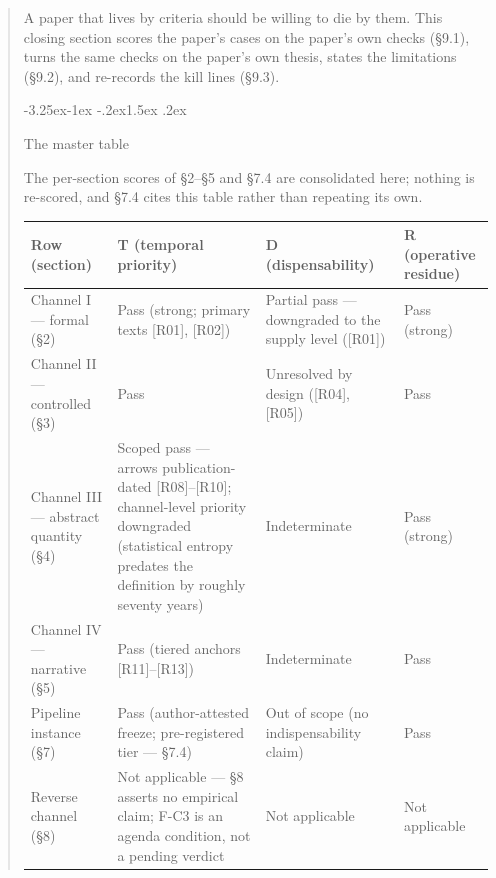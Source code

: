 \documentclass[11pt,a4paper]{article}
\makeatletter
\renewcommand\subsection{\@startsection{subsection}{2}{\z@}%
  {-3.25ex\@plus -1ex \@minus -.2ex}{1.5ex \@plus .2ex}%
  {\normalfont\large\bfseries\raggedright}}
\makeatother
\begin{document}
\begin{abstract}
A paper that lives by criteria should be willing to die by them. This closing section scores the paper's cases on the paper's own checks (§9.1), turns the same checks on the paper's own thesis, states the limitations (§9.2), and re-records the kill lines (§9.3).

\subsection{The master table}

The per-section scores of §2–§5 and §7.4 are consolidated here; nothing is re-scored, and §7.4 cites this table rather than repeating its own.

\begin{table}[htbp]
\centering
\footnotesize
\setlength{\tabcolsep}{3.5pt}
\renewcommand{\arraystretch}{1.18}
\begin{tabularx}{0.985\textwidth}{@{}>{\raggedright\arraybackslash}p{}>{\raggedright\arraybackslash}X>{\raggedright\arraybackslash}X>{\raggedright\arraybackslash}X@{}}
\toprule
\textbf{Row (section)} & \textbf{T (temporal priority)} & \textbf{D (dispensability)} & \textbf{R (operative residue)} \\
\midrule
Channel I — formal (§2) & Pass (strong; primary texts [R01], [R02]) & Partial pass — downgraded to the supply level ([R01]) & Pass (strong) \\
Channel II — controlled (§3) & Pass & Unresolved by design ([R04], [R05]) & Pass \\
Channel III — abstract quantity (§4) & Scoped pass — arrows publication-dated [R08]–[R10]; channel-level priority downgraded (statistical entropy predates the definition by roughly seventy years) & Indeterminate & Pass (strong) \\
Channel IV — narrative (§5) & Pass (tiered anchors [R11]–[R13]) & Indeterminate & Pass \\
Pipeline instance (§7) & Pass (author-attested freeze; pre-registered tier — §7.4) & Out of scope (no indispensability claim) & Pass \\
Reverse channel (§8) & Not applicable — §8 asserts no empirical claim; F-C3 is an agenda condition, not a pending verdict & Not applicable & Not applicable \\
\bottomrule
\end{tabularx}
\end{table}


\end{abstract}
\end{document}
